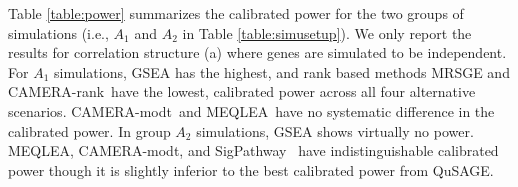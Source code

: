 \documentclass[useAMS,usenatbib, galley]{biom}
\newcommand{\OurMethod}{MEQLEA}
\newcommand{\aaCase}{a}
\newcommand{\CMR}{CAMERA-rank}
\newcommand{\CMT}{CAMERA-modt}
\newcommand{\gent}{SigPathway}
\begin{document}
	Table \ref{table:power} summarizes the calibrated power for the two groups of simulations (i.e., $A_1$ and $A_2$ in Table \ref{table:simusetup}). We only report the results for correlation structure (\aaCase) where genes are simulated to be independent. %
	For $A_1$ simulations, GSEA has the highest, and rank based methods MRSGE and \CMR~have the lowest, calibrated power across all four alternative scenarios. \CMT~and \OurMethod~have no systematic difference in the calibrated power. %
	 In group $A_2$ simulations, GSEA shows virtually no power. \OurMethod, \CMT, and \gent~ have indistinguishable calibrated power though it is slightly inferior to the best calibrated power from QuSAGE. 	
\end{document}
